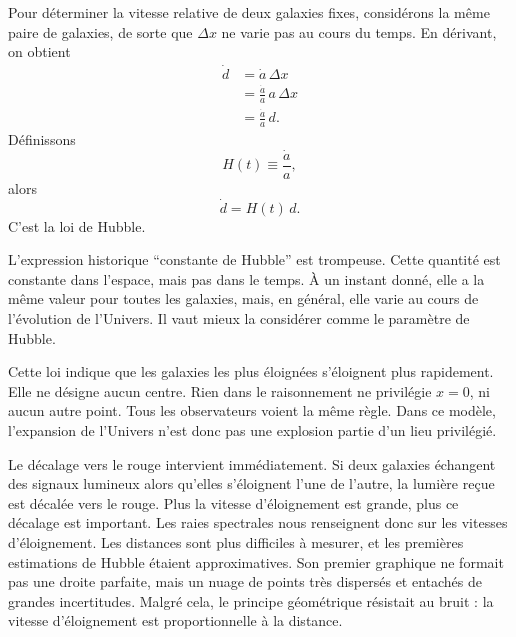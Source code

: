 Pour déterminer la vitesse relative de deux galaxies fixes, considérons la même paire de galaxies, de sorte que \(\Delta x\) ne varie pas au cours du temps. En dérivant, on obtient
\begin{align}
\dot d &= \dot a\,\Delta x \\
       &= \frac{\dot a}{a}\,a\,\Delta x \\
       &= \frac{\dot a}{a}\,d.
\end{align}
Définissons
\begin{equation}
H(t)\equiv \frac{\dot a}{a},
\end{equation}
alors
\begin{equation}
\dot d = H(t)\,d.
\end{equation}
C’est la loi de Hubble.

L’expression historique ``constante de Hubble'' est trompeuse. Cette quantité est constante dans l’espace, mais pas dans le temps. À un instant donné, elle a la même valeur pour toutes les galaxies, mais, en général, elle varie au cours de l’évolution de l’Univers. Il vaut mieux la considérer comme le paramètre de Hubble.

Cette loi indique que les galaxies les plus éloignées s’éloignent plus rapidement. Elle ne désigne aucun centre. Rien dans le raisonnement ne privilégie \(x=0\), ni aucun autre point. Tous les observateurs voient la même règle. Dans ce modèle, l’expansion de l’Univers n’est donc pas une explosion partie d’un lieu privilégié.

Le décalage vers le rouge intervient immédiatement. Si deux galaxies échangent des signaux lumineux alors qu’elles s’éloignent l’une de l’autre, la lumière reçue est décalée vers le rouge. Plus la vitesse d’éloignement est grande, plus ce décalage est important. Les raies spectrales nous renseignent donc sur les vitesses d’éloignement. Les distances sont plus difficiles à mesurer, et les premières estimations de Hubble étaient approximatives. Son premier graphique ne formait pas une droite parfaite, mais un nuage de points très dispersés et entachés de grandes incertitudes. Malgré cela, le principe géométrique résistait au bruit : la vitesse d’éloignement est proportionnelle à la distance.

\begin{classroomqa}\end{classroomqa}

